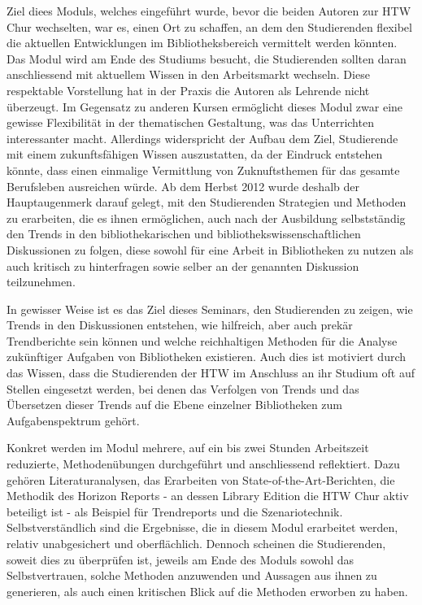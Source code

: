 \documentclass[a4paper,
fontsize=11pt,
oneside,
numbers=noperiodatend,
parskip=half-,
bibliography=totoc,
final
]{scrartcl}
\begin{document}
Ziel diees Moduls, welches eingeführt wurde, bevor die beiden Autoren
zur HTW Chur wechselten, war es, einen Ort zu schaffen, an dem den
Studierenden flexibel die aktuellen Entwicklungen im Bibliotheksbereich
vermittelt werden könnten. Das Modul wird am Ende des Studiums besucht,
die Studierenden sollten daran anschliessend mit aktuellem Wissen in den
Arbeitsmarkt wechseln. Diese respektable Vorstellung hat in der Praxis
die Autoren als Lehrende nicht überzeugt. Im Gegensatz zu anderen Kursen
ermöglicht dieses Modul zwar eine gewisse Flexibilität in der
thematischen Gestaltung, was das Unterrichten interessanter macht.
Allerdings widerspricht der Aufbau dem Ziel, Studierende mit einem
zukunftsfähigen Wissen auszustatten, da der Eindruck entstehen könnte,
dass einen einmalige Vermittlung von Zuknuftsthemen für das gesamte
Berufsleben ausreichen würde. Ab dem Herbst 2012 wurde deshalb der
Hauptaugenmerk darauf gelegt, mit den Studierenden Strategien und
Methoden zu erarbeiten, die es ihnen ermöglichen, auch nach der
Ausbildung selbstständig den Trends in den bibliothekarischen und
bibliothekswissenschaftlichen Diskussionen zu folgen, diese sowohl für
eine Arbeit in Bibliotheken zu nutzen als auch kritisch zu hinterfragen
sowie selber an der genannten Diskussion teilzunehmen.

In gewisser Weise ist es das Ziel dieses Seminars, den Studierenden zu
zeigen, wie Trends in den Diskussionen entstehen, wie hilfreich, aber
auch prekär Trendberichte sein können und welche reichhaltigen Methoden
für die Analyse zukünftiger Aufgaben von Bibliotheken existieren. Auch
dies ist motiviert durch das Wissen, dass die Studierenden der HTW im
Anschluss an ihr Studium oft auf Stellen eingesetzt werden, bei denen
das Verfolgen von Trends und das Übersetzen dieser Trends auf die Ebene
einzelner Bibliotheken zum Aufgabenspektrum gehört.

Konkret werden im Modul mehrere, auf ein bis zwei Stunden Arbeitszeit
reduzierte, Methodenübungen durchgeführt und anschliessend reflektiert.
Dazu gehören Literaturanalysen, das Erarbeiten von
State-of-the-Art-Berichten, die Methodik des Horizon Reports - an dessen
Library Edition die HTW Chur aktiv beteiligt ist - als Beispiel für
Trendreports und die Szenariotechnik. Selbstverständlich sind die
Ergebnisse, die in diesem Modul erarbeitet werden, relativ unabgesichert
und oberflächlich. Dennoch scheinen die Studierenden, soweit dies zu
überprüfen ist, jeweils am Ende des Moduls sowohl das Selbstvertrauen,
solche Methoden anzuwenden und Aussagen aus ihnen zu generieren, als
auch einen kritischen Blick auf die Methoden erworben zu haben.
\end{document}
